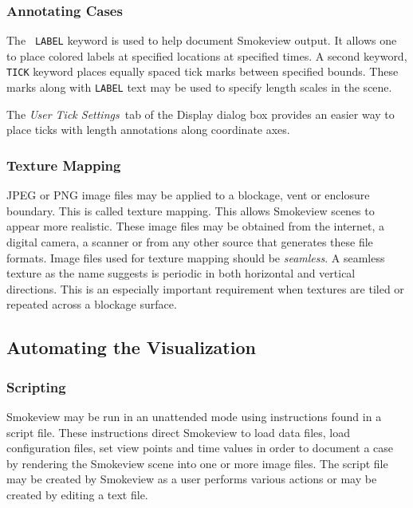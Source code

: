 \documentclass[11pt,twoside]{book}
\begin{document}
\subsubsection{Annotating Cases}The {\tt
LABEL} keyword is used to help document Smokeview output.
It allows one to place colored labels at specified
locations at specified times.  A second keyword, {\tt TICK} keyword places
equally spaced tick marks between specified bounds. These marks
along with {\tt LABEL} text may be used to specify length scales
in the scene.

The {\em User Tick Settings}\ tab of the Display dialog box
provides an easier way to place ticks with length annotations along coordinate axes.

\subsubsection{Texture Mapping} JPEG or PNG image files may be applied to a
blockage, vent or enclosure boundary. This is called texture
mapping.  This allows Smokeview scenes to appear more
realistic. These image files may be obtained from the
internet, a digital camera, a scanner or from any other source
that generates these file formats. Image files used for texture
mapping should be {\em seamless}. A seamless texture as the name
suggests is periodic in both horizontal and vertical directions.
This is an especially important requirement when textures are tiled or
repeated across a blockage surface.

\subsection{Automating the Visualization}
\subsubsection{Scripting} Smokeview may be run in an unattended mode using
instructions found in a script file.
These instructions direct Smokeview to load data files, load configuration files,
set view points and time values in order to document a case by rendering
the Smokeview scene into one or more image files.
The script file may be created by Smokeview as a user performs various actions
or may be created by editing a text file.
\end{document}
